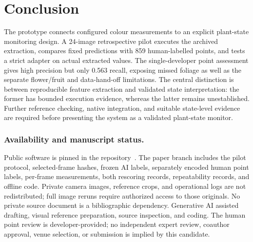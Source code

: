 \documentclass[runningheads]{llncs}
\begin{document}
\section{Conclusion}
\label{sec:conclusion}
The prototype connects configured colour measurements to an explicit plant-state monitoring design. A 24-image retrospective pilot executes the archived extraction, compares fixed predictions with 859 human-labelled points, and tests a strict adapter on actual extracted values. The single-developer point assessment gives high precision but only 0.563 recall, exposing missed foliage as well as the separate flower/fruit and data-hand-off limitations. The central distinction is between reproducible feature extraction and validated state interpretation: the former has bounded execution evidence, whereas the latter remains unestablished. Further reference checking, native integration, and suitable state-level evidence are required before presenting the system as a validated plant-state monitor.

\subsubsection*{Availability and manuscript status.}
Public software is pinned in the repository~\cite{autotent}. The paper branch includes the pilot protocol, selected-frame hashes, frozen AI labels, separately encoded human point labels, per-frame measurements, both rescoring records, repeatability records, and offline code. Private camera images, reference crops, and operational logs are not redistributed; full image reruns require authorized access to those originals. No private source document is a bibliographic dependency. Generative AI assisted drafting, visual reference preparation, source inspection, and coding. The human point review is developer-provided; no independent expert review, coauthor approval, venue selection, or submission is implied by this candidate.



\end{document}
